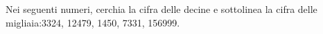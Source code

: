 \item Nei seguenti numeri, cerchia la cifra delle decine e sottolinea la cifra delle migliaia:3324, 12479, 1450, 7331, 156999.